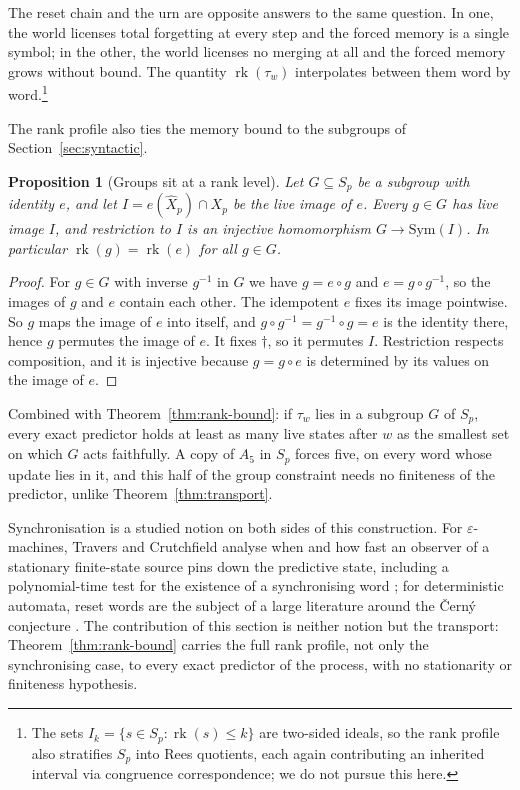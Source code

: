 \documentclass[10pt]{article}
\newtheorem{proposition}[theorem]{Proposition}
\theoremstyle{definition}
\theoremstyle{remark}
\newcommand{\rk}{\operatorname{rk}}
\begin{document}
The reset chain and the urn are opposite answers to the same question.
In one, the world licenses total forgetting at every step and the forced
memory is a single symbol; in the other, the world licenses no merging
at all and the forced memory grows without bound.  The quantity
$\rk(\tau_w)$ interpolates between them word by word.\footnote{The sets $I_k=\{s\in S_p:\rk(s)\le k\}$ are two-sided ideals, so the rank profile also stratifies
$S_p$ into Rees quotients, each again contributing an inherited
interval via congruence correspondence; we do not pursue this here.}

The rank profile also ties the memory bound to the subgroups of
Section~\ref{sec:syntactic}.

\begin{proposition}[Groups sit at a rank level]
\label{prop:group-rank}
Let $G\subseteq S_p$ be a subgroup with identity $e$, and let
$I=e(\widehat X_p)\cap X_p$ be the live image of $e$.  Every $g\in G$
has live image $I$, and restriction to $I$ is an injective
homomorphism $G\to\mathrm{Sym}(I)$.  In particular $\rk(g)=\rk(e)$
for all $g\in G$.
\end{proposition}

\begin{proof}
For $g\in G$ with inverse $g^{-1}$ in $G$ we have $g=e\circ g$ and
$e=g\circ g^{-1}$, so the images of $g$ and $e$ contain each other.
The idempotent $e$ fixes its image pointwise.  So $g$ maps the image
of $e$ into itself, and $g\circ g^{-1}=g^{-1}\circ g=e$ is the
identity there, hence $g$ permutes the image of $e$.  It fixes
$\dagger$, so it permutes $I$.  Restriction respects composition, and
it is injective because $g=g\circ e$ is determined by its values on
the image of $e$.
\end{proof}

Combined with Theorem~\ref{thm:rank-bound}: if $\tau_w$ lies in a
subgroup $G$ of $S_p$, every exact predictor holds at least as many
live states after $w$ as the smallest set on which $G$ acts
faithfully.  A copy of $A_5$ in $S_p$ forces five, on every word
whose update lies in it, and this half of the group constraint needs
no finiteness of the predictor, unlike
Theorem~\ref{thm:transport}.

Synchronisation is a studied notion on both sides of this construction.
For $\varepsilon$-machines, Travers and Crutchfield analyse when and
how fast an observer of a stationary finite-state source pins down the
predictive state, including a polynomial-time test for the existence of
a synchronising word
\cite{TraversCrutchfield2011a,TraversCrutchfield2011b}; for
deterministic automata, reset words are the subject of a large
literature around the \v{C}ern\'y conjecture \cite{Volkov2008}.  The
contribution of this section is neither notion but the transport:
Theorem~\ref{thm:rank-bound} carries the full rank profile, not only
the synchronising case, to every exact predictor of the process, with
no stationarity or finiteness hypothesis.
\end{document}
